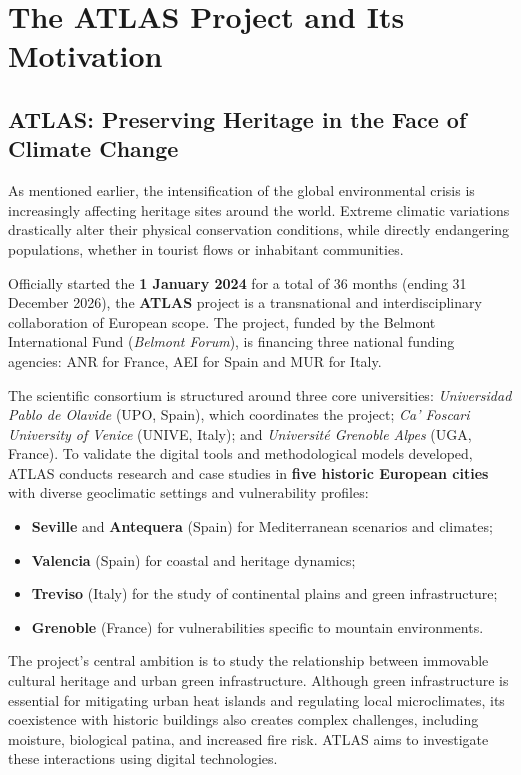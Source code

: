 \documentclass{article}
\begin{document}
\section{The ATLAS Project and Its Motivation}

\subsection{ATLAS: Preserving Heritage in the Face of Climate Change}

As mentioned earlier, the intensification of the global environmental crisis is increasingly affecting heritage sites around the world. Extreme climatic variations drastically alter their physical conservation conditions, while directly endangering populations, whether in tourist flows or inhabitant communities.

Officially started the \textbf{1 January 2024} for a total of 36 months (ending 31 December 2026), the \textbf{ATLAS} project is a transnational and interdisciplinary collaboration of European scope. The project, funded by the Belmont International Fund (\textit{Belmont Forum}), is financing three national funding agencies: ANR for France, AEI for Spain and MUR for Italy.

The scientific consortium is structured around three core universities: \textit{Universidad Pablo de Olavide} (UPO, Spain), which coordinates the project; \textit{Ca' Foscari University of Venice} (UNIVE, Italy); and \textit{Université Grenoble Alpes} (UGA, France). To validate the digital tools and methodological models developed, ATLAS conducts research and case studies in \textbf{five historic European cities} with diverse geoclimatic settings and vulnerability profiles:
\begin{itemize}
\item \textbf{Seville} and \textbf{Antequera} (Spain) for Mediterranean scenarios and climates;
\item \textbf{Valencia} (Spain) for coastal and heritage dynamics;
\item \textbf{Treviso} (Italy) for the study of continental plains and green infrastructure;
\item \textbf{Grenoble} (France) for vulnerabilities specific to mountain environments.
\end{itemize}

The project's central ambition is to study the relationship between immovable cultural heritage and urban green infrastructure. Although green infrastructure is essential for mitigating urban heat islands and regulating local microclimates, its coexistence with historic buildings also creates complex challenges, including moisture, biological patina, and increased fire risk. ATLAS aims to investigate these interactions using digital technologies.
\end{document}
